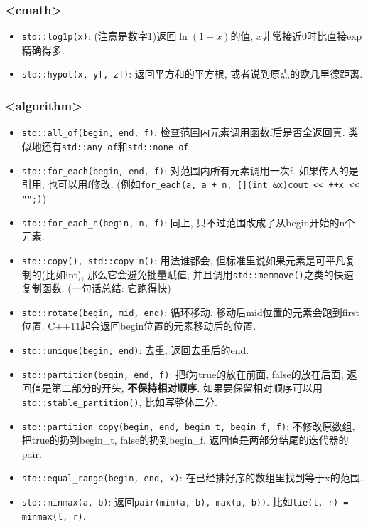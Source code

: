 \subsubsection{<cmath>}

\begin{itemize}
	\item \texttt{std::log1p(x)}: (注意是数字1)返回$\ln(1 + x)$的值, $x$非常接近$0$时比直接exp精确得多.
	\item \texttt{std::hypot(x, y[, z])}: 返回平方和的平方根, 或者说到原点的欧几里德距离.
\end{itemize}

\subsubsection{<algorithm>}

\begin{itemize}
	\item \texttt{std::all_of(begin, end, f)}: 检查范围内元素调用函数f后是否全返回真. 类似地还有\texttt{std::any_of}和\texttt{std::none_of}.
	\item \texttt{std::for_each(begin, end, f)}: 对范围内所有元素调用一次f. 如果传入的是引用, 也可以用f修改. (例如\texttt{for_each(a, a + n, [](int &x){cout << ++x << "\n";})})
	\item \texttt{std::for_each_n(begin, n, f)}: 同上, 只不过范围改成了从begin开始的n个元素.
	\item \texttt{std::copy(), std::copy_n()}: 用法谁都会, 但标准里说如果元素是可平凡复制的(比如int), 那么它会避免批量赋值, 并且调用\texttt{std::memmove()}之类的快速复制函数. (一句话总结: 它跑得快)
	\item \texttt{std::rotate(begin, mid, end)}: 循环移动, 移动后mid位置的元素会跑到first位置. C++11起会返回begin位置的元素移动后的位置.
	\item \texttt{std::unique(begin, end)}: 去重, 返回去重后的end.
	\item \texttt{std::partition(begin, end, f)}: 把f为true的放在前面, false的放在后面, 返回值是第二部分的开头, \textbf{不保持相对顺序}. 如果要保留相对顺序可以用\texttt{std::stable_partition()}, 比如写整体二分.
	\item \texttt{std::partition_copy(begin, end, begin_t, begin_f, f)}: 不修改原数组, 把true的扔到begin\_t, false的扔到begin\_f. 返回值是两部分结尾的迭代器的pair.
	\item \texttt{std::equal_range(begin, end, x)}: 在已经排好序的数组里找到等于x的范围.
	\item \texttt{std::minmax(a, b)}: 返回\texttt{pair(min(a, b), max(a, b))}. 比如\texttt{tie(l, r) = minmax(l, r)}.
\end{itemize}

